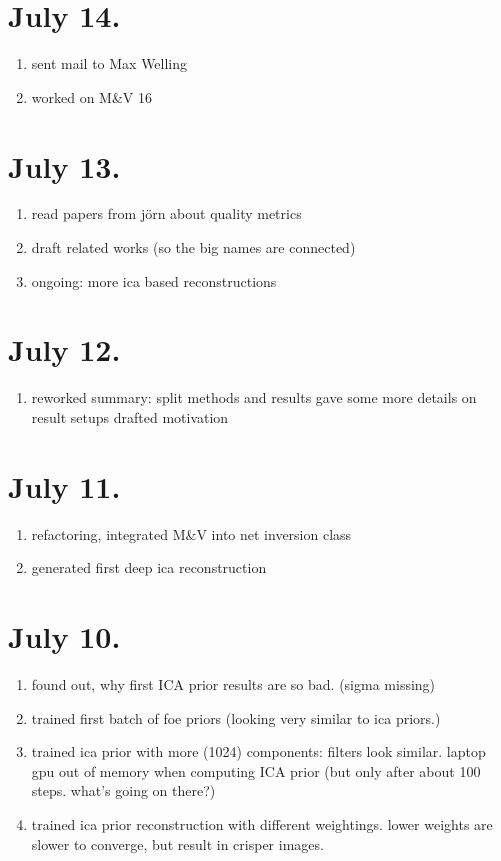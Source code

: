 \documentclass{article}
\begin{document}
\section*{July 14.}

\begin{enumerate}
 	\item sent mail to Max Welling
 	\item worked on M\&V 16
\end{enumerate}

\section*{July 13.}

\begin{enumerate}
	\item read papers from jörn about quality metrics
	\item draft related works (so the big names are connected)
	\item ongoing: more ica based reconstructions
\end{enumerate}
	
\section*{July 12.}

\begin{enumerate}
	\item reworked summary:
	\subitem split methods and results
	\subitem gave some more details on result setups
	\subitem drafted motivation
\end{enumerate}

\section*{July 11.}

\begin{enumerate}
	\item refactoring, integrated M\&V into net inversion class
	\item generated first deep ica reconstruction
\end{enumerate}

\section*{July 10.}

\begin{enumerate}
	\item found out, why first ICA prior results are so bad. (sigma missing)
	\item trained first batch of foe priors (looking very similar to ica priors.)
	\item trained ica prior with more (1024) components: filters look similar. laptop gpu out of memory when computing ICA prior (but only after about 100 steps. what's going on there?)
	\item trained ica prior reconstruction with different weightings. lower weights are slower to converge, but result in crisper images.
\end{enumerate}
\end{document}
